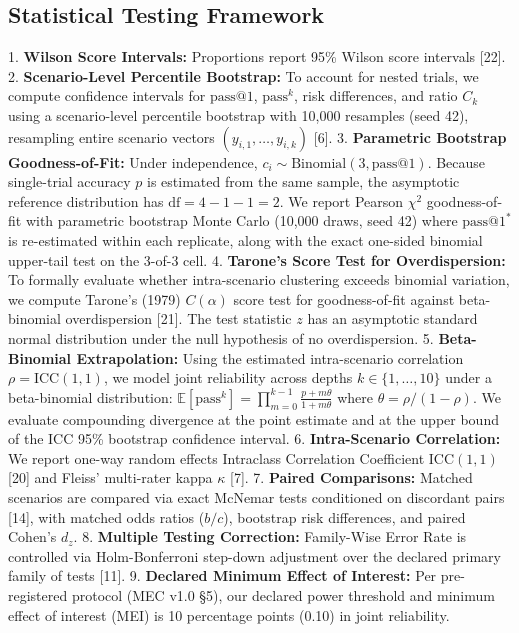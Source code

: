 \documentclass[11pt,letterpaper]{article}
\begin{document}
\subsection{Statistical Testing Framework}
1. \textbf{Wilson Score Intervals:} Proportions report 95\% Wilson score intervals [22].
2. \textbf{Scenario-Level Percentile Bootstrap:} To account for nested trials, we compute confidence intervals for $\text{pass@1}$, $\text{pass}^k$, risk differences, and ratio $C_k$ using a scenario-level percentile bootstrap with 10,000 resamples (seed 42), resampling entire scenario vectors $(y_{i,1}, \dots, y_{i,k})$ [6].
3. \textbf{Parametric Bootstrap Goodness-of-Fit:} Under independence, $c_i \sim \text{Binomial}(3, \text{pass@1})$. Because single-trial accuracy $p$ is estimated from the same sample, the asymptotic reference distribution has $\text{df} = 4 - 1 - 1 = 2$. We report Pearson $\chi^2$ goodness-of-fit with parametric bootstrap Monte Carlo (10,000 draws, seed 42) where $\text{pass@1}^*$ is re-estimated within each replicate, along with the exact one-sided binomial upper-tail test on the 3-of-3 cell.
4. \textbf{Tarone's Score Test for Overdispersion:} To formally evaluate whether intra-scenario clustering exceeds binomial variation, we compute Tarone's (1979) $C(\alpha)$ score test for goodness-of-fit against beta-binomial overdispersion [21]. The test statistic $z$ has an asymptotic standard normal distribution under the null hypothesis of no overdispersion.
5. \textbf{Beta-Binomial Extrapolation:} Using the estimated intra-scenario correlation $\rho = \text{ICC}(1,1)$, we model joint reliability across depths $k \in \{1, \dots, 10\}$ under a beta-binomial distribution: $\mathbb{E}[\text{pass}^k] = \prod_{m=0}^{k-1} \frac{p + m \theta}{1 + m \theta}$ where $\theta = \rho / (1 - \rho)$. We evaluate compounding divergence at the point estimate and at the upper bound of the ICC 95\% bootstrap confidence interval.
6. \textbf{Intra-Scenario Correlation:} We report one-way random effects Intraclass Correlation Coefficient $\text{ICC}(1,1)$ [20] and Fleiss' multi-rater kappa $\kappa$ [7].
7. \textbf{Paired Comparisons:} Matched scenarios are compared via exact McNemar tests conditioned on discordant pairs [14], with matched odds ratios ($b/c$), bootstrap risk differences, and paired Cohen's $d_z$.
8. \textbf{Multiple Testing Correction:} Family-Wise Error Rate is controlled via Holm-Bonferroni step-down adjustment over the declared primary family of tests [11].
9. \textbf{Declared Minimum Effect of Interest:} Per pre-registered protocol (MEC v1.0 §5), our declared power threshold and minimum effect of interest (MEI) is 10 percentage points (0.10) in joint reliability.
\end{document}
